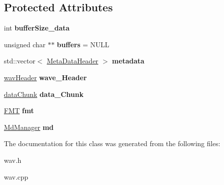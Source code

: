 \subsection*{Protected Attributes}
\begin{DoxyCompactItemize}
\item 
\mbox{\label{classWav_aaa1fc130f301f39cc74091dfb9750d13}} 
int {\bfseries buffer\+Size\+\_\+data}
\item 
\mbox{\label{classWav_a78fcf3bfe5e1d602a85cf41bf23285ef}} 
unsigned char $\ast$$\ast$ {\bfseries buffers} = N\+U\+LL
\item 
\mbox{\label{classWav_af1e9806d4b9efb6b466954771292e6b1}} 
std\+::vector$<$ \hyperlink{structMetaDataHeader}{Meta\+Data\+Header} $>$ {\bfseries metadata}
\item 
\mbox{\label{classWav_a3d95345a678bba0772e48325306ecda1}} 
\hyperlink{structwavHeader}{wav\+Header} {\bfseries wave\+\_\+\+Header}
\item 
\mbox{\label{classWav_ad56011c7baf92b85b81483d7ef8b58ef}} 
\hyperlink{structdataChunk}{data\+Chunk} {\bfseries data\+\_\+\+Chunk}
\item 
\mbox{\label{classWav_a2d8b662300b2821186951e428da6a6a9}} 
\hyperlink{structFMT}{F\+MT} {\bfseries fmt}
\item 
\mbox{\label{classWav_acae0c41dcc691b4ca92b510f482c3ca1}} 
\hyperlink{classMdManager}{Md\+Manager} {\bfseries md}
\end{DoxyCompactItemize}


The documentation for this class was generated from the following files\+:\begin{DoxyCompactItemize}
\item 
wav.\+h\item 
wav.\+cpp\end{DoxyCompactItemize}
